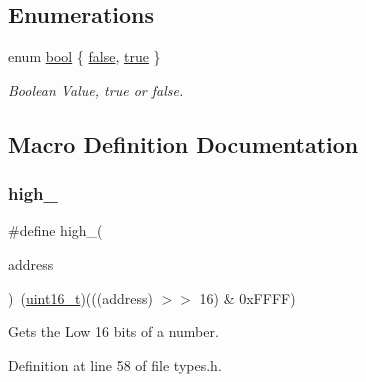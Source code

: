 \subsection*{Enumerations}
\begin{DoxyCompactItemize}
\item 
enum \hyperlink{a00140_af6a258d8f3ee5206d682d799316314b1_af6a258d8f3ee5206d682d799316314b1}{bool} \{ \hyperlink{a00140_af6a258d8f3ee5206d682d799316314b1_af6a258d8f3ee5206d682d799316314b1ae9de385ef6fe9bf3360d1038396b884c}{false}, 
\hyperlink{a00140_af6a258d8f3ee5206d682d799316314b1_af6a258d8f3ee5206d682d799316314b1a08f175a5505a10b9ed657defeb050e4b}{true}
 \}\begin{DoxyCompactList}\small\item\em Boolean Value, true or false. \end{DoxyCompactList}
\end{DoxyCompactItemize}


\subsection{Macro Definition Documentation}
\mbox{\label{a00140_a0a63db19c3e2153ed419aeccf4e33c92_a0a63db19c3e2153ed419aeccf4e33c92}} 
\subsubsection{\texorpdfstring{high\+\_}{high\_16}}
{\footnotesize\ttfamily \#define high\+\_(\begin{DoxyParamCaption}\item[{}]{address }\end{DoxyParamCaption})~(\hyperlink{a00140_a273cf69d639a59973b6019625df33e30_a273cf69d639a59973b6019625df33e30}{uint16\+\_\+t})(((address) $>$$>$ 16) \& 0x\+F\+F\+F\+F)}



Gets the Low 16 bits of a number. 



Definition at line 58 of file types.\+h.

\mbox{\label{a00140_aded7ad58a4bedfffea10d5ae9c0c817e_aded7ad58a4bedfffea10d5ae9c0c817e}} 

